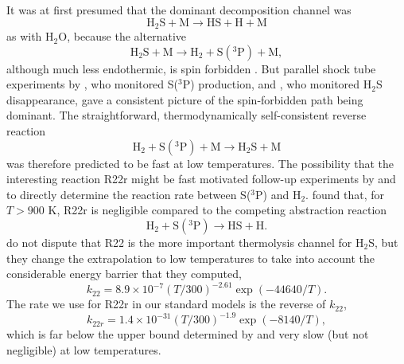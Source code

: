 \documentclass[preprint]{aastex6}
\newcounter{reaction}
\begin{document}
 It was at first presumed that the dominant decomposition channel was 
\begin{equation}  \tag{R21}
 \mathrm{H}_2\mathrm{S} + \mathrm{M} \rightarrow  \mathrm{HS} + \mathrm{H} + \mathrm{M}   
\end{equation} 
as with H$_2$O, because the alternative
 \begin{equation}\tag{R22}
 \mathrm{H}_2\mathrm{S} + \mathrm{M} \rightarrow  \mathrm{H}_2 + \mathrm{S}(^3\mathrm{P}) + \mathrm{M} , 
 \end{equation}
although much less endothermic, is spin forbidden \citep{Roth1982}.
But parallel shock tube experiments by \citet{Woiki1994}, who monitored S($^3$P) production, 
and \citet{Olschewski1994}, who monitored H$_2$S disappearance, gave a consistent picture
of the spin-forbidden path being dominant.
The straightforward, thermodynamically self-consistent reverse reaction 
 \begin{equation}\tag{R22r}
 \mathrm{H}_2 + \mathrm{S}(^3\mathrm{P}) + \mathrm{M} \rightarrow  \mathrm{H}_2\mathrm{S} + \mathrm{M}  
 \end{equation}
 was therefore predicted to be fast at low temperatures. 
% 
The possibility that the interesting reaction R22r might be fast 
motivated follow-up experiments by \citet{Woiki1995a} and \citet{Shiina1996,Shiina1998} to directly determine the reaction rate
between S($^3$P) and H$_2$. 
\citet{Shiina1998} found that, for $T>900$ K, R22r is negligible compared to the competing abstraction
reaction 
 \begin{equation}\tag{R9r}
 \mathrm{H}_2 + \mathrm{S}(^3\mathrm{P}) \rightarrow  \mathrm{HS} + \mathrm{H}.
 \end{equation}
\citet{Shiina1998} do not dispute that R22 is the more important thermolysis channel for H$_2$S,
but they change the extrapolation to low
temperatures to take into account the considerable energy barrier that they computed,
\begin{equation}
\label{k22}
k_{22} = 8.9\times 10^{-7} \left(T/300\right)^{-2.61} \exp{\left(-44640/T\right)} .
\end{equation}   
The rate we use for R22r in our standard models is the reverse of $k_{22}$,  
\begin{equation}
\label{k22r}
k_{22r} = 1.4\times 10^{-31} \left(T/300\right)^{-1.9} \exp{\left(-8140/T\right)},
\end{equation}   
which is far below the upper bound determined by \citet{Shiina1998}
and very slow (but not negligible) at low temperatures.  
\end{document}
